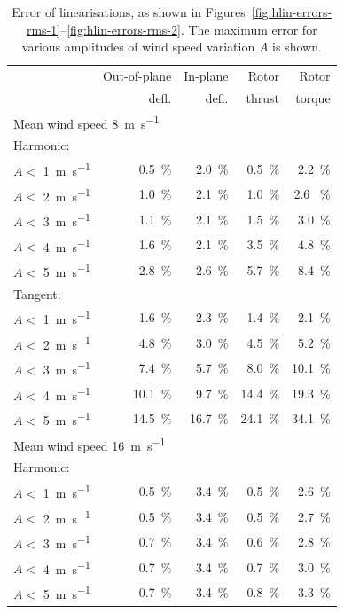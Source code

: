 \documentclass[preprint]{elsarticle}
\begin{document}
\begin{table}
  \centering
  \caption{Error of linearisations, as shown in
    Figures~\protect\ref{fig:hlin-errors-rms-1}--\protect\ref{fig:hlin-errors-rms-2}. The
    maximum error for various amplitudes of wind speed variation $A$ is shown.}
  \label{tab:hlin-errors-peak}
  \begin{tabular}{lrrrr}
    \toprule
     & Out-of-plane & In-plane & Rotor & Rotor \\
     & defl. & defl. & thrust & torque \\
    \midrule
    \multicolumn{4}{l}{Mean wind speed \SI{8}{\metre\per\second}} \\[1em]
    \multicolumn{4}{l}{Harmonic:} \\
    $A<$ \SI{ 1 }{\metre\per\second}& \SI{ 0.5 }{\%}& \SI{ 2.0 }{\%}& \SI{ 0.5 }{\%}& \SI{ 2.2 }{\%}\\
    $A<$ \SI{ 2 }{\metre\per\second}& \SI{ 1.0 }{\%}& \SI{ 2.1 }{\%}& \SI{ 1.0 }{\%}& \SI{ 2.6
 }{\%}\\
    $A<$ \SI{ 3 }{\metre\per\second}& \SI{ 1.1 }{\%}& \SI{ 2.1 }{\%}& \SI{ 1.5 }{\%}& \SI{ 3.0 }{\%}\\
    $A<$ \SI{ 4 }{\metre\per\second}& \SI{ 1.6 }{\%}& \SI{ 2.1 }{\%}& \SI{ 3.5 }{\%}& \SI{ 4.8 }{\%}\\
    $A<$ \SI{ 5 }{\metre\per\second}& \SI{ 2.8 }{\%}& \SI{ 2.6 }{\%}&
                                                                        \SI{ 5.7 }{\%}& \SI{ 8.4 }{\%}\\
    \multicolumn{4}{l}{Tangent:} \\
    $A<$ \SI{ 1 }{\metre\per\second}& \SI{ 1.6 }{\%}& \SI{ 2.3 }{\%}& \SI{ 1.4 }{\%}& \SI{ 2.1 }{\%}\\
    $A<$ \SI{ 2 }{\metre\per\second}& \SI{ 4.8 }{\%}& \SI{ 3.0 }{\%}& \SI{ 4.5 }{\%}& \SI{ 5.2 }{\%}\\
    $A<$ \SI{ 3 }{\metre\per\second}& \SI{ 7.4 }{\%}& \SI{ 5.7 }{\%}& \SI{ 8.0 }{\%}& \SI{ 10.1 }{\%}\\
    $A<$ \SI{ 4 }{\metre\per\second}& \SI{ 10.1 }{\%}& \SI{ 9.7 }{\%}& \SI{ 14.4 }{\%}& \SI{ 19.3 }{\%}\\
    $A<$ \SI{ 5 }{\metre\per\second}& \SI{ 14.5 }{\%}& \SI{ 16.7 }{\%}& \SI{ 24.1 }{\%}& \SI{ 34.1 }{\%}\\[1em]

    \midrule
    \multicolumn{4}{l}{Mean wind speed \SI{16}{\metre\per\second}} \\[1em]
    \multicolumn{4}{l}{Harmonic:} \\
$A<$ \SI{ 1 }{\metre\per\second}& \SI{ 0.5 }{\%}& \SI{ 3.4 }{\%}& \SI{ 0.5 }{\%}& \SI{ 2.6 }{\%}\\
$A<$ \SI{ 2 }{\metre\per\second}& \SI{ 0.5 }{\%}& \SI{ 3.4 }{\%}& \SI{ 0.5 }{\%}& \SI{ 2.7 }{\%}\\
$A<$ \SI{ 3 }{\metre\per\second}& \SI{ 0.7 }{\%}& \SI{ 3.4 }{\%}& \SI{ 0.6 }{\%}& \SI{ 2.8 }{\%}\\
$A<$ \SI{ 4 }{\metre\per\second}& \SI{ 0.7 }{\%}& \SI{ 3.4 }{\%}& \SI{ 0.7 }{\%}& \SI{ 3.0 }{\%}\\
$A<$ \SI{ 5 }{\metre\per\second}& \SI{ 0.7 }{\%}& \SI{ 3.4 }{\%}& \SI{ 0.8 }{\%}& \SI{ 3.3 }{\%}\\[1em]


\end{tabular}
\end{table}
\end{document}
